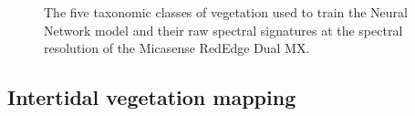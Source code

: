 \documentclass[
  number]{elsarticle}
\begin{document}
\label{cell-fig-vegetation}
\begin{figure}[H]


\caption{\label{fig-vegetation}The five taxonomic classes of vegetation
used to train the Neural Network model and their raw spectral signatures
at the spectral resolution of the Micasense RedEdge Dual MX.}

\end{figure}%

\subsection{Intertidal vegetation
mapping}\label{intertidal-vegetation-mapping}
\end{document}
